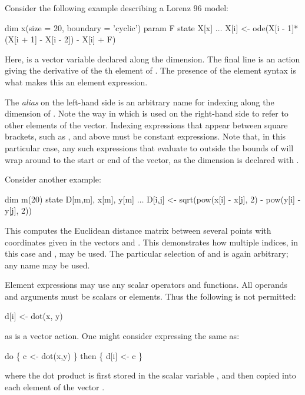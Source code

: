 Consider the following example describing a Lorenz 96 model:
\begin{bicode}
dim x(size = 20, boundary = 'cyclic')
param F
state X[x]
\(\ldots\)
X[i] <- ode(X[i - 1]*(X[i + 1] - X[i - 2]) - X[i] + F)
\end{bicode}

Here,  is a vector variable declared along the 
dimension. The final line is an 
action giving the derivative of the th element of . The
presence of the element syntax  is what makes this an element
expression.

The \textit{alias}  on the left-hand side is an arbitrary name for
indexing along the dimension of . Note the way in which 
is used on the right-hand side to refer to other elements of the 
vector. Indexing expressions that appear between square brackets, such as
\bitt{[i + 1]}, \bitt{[i - 2]} and \bitt{[i]} above must be constant
expressions. Note that, in this particular case,
any such expressions that evaluate to outside the bounds of  will
wrap around to the start or end of the vector, as the  dimension is
declared with .

Consider another example:
\begin{bicode}
dim m(20)
state D[m,m], x[m], y[m]
\(\ldots\)
D[i,j] <- sqrt(pow(x[i] - x[j], 2) - pow(y[i] - y[j], 2))
\end{bicode}

This computes the Euclidean distance
matrix  between several points
with coordinates given in the vectors  and
. This demonstrates how multiple indices, in this case  and
, may be used. The particular selection of  and  is
again arbitrary; any name may be used.

Element expressions may use any
scalar operators and functions. All operands and arguments must
be scalars or elements. Thus the following is not permitted:
\begin{bicode}
d[i] <- dot(x, y)
\end{bicode}
as  is a vector action. One might consider expressing the same
as:
\begin{bicode}
do \{
  c <- dot(x,y)
\} then \{
  d[i] <- c
\}
\end{bicode}
where the dot product is first stored in the scalar variable , and
then copied into each element of the vector .

